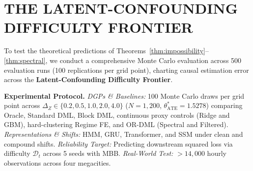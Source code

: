 \documentclass[twoside]{article}
\theoremstyle{definition}
\begin{document}
\vspace{-2mm}
\section{THE LATENT-CONFOUNDING DIFFICULTY FRONTIER}
\label{sec:experiments}

To test the theoretical predictions of Theorems~\ref{thm:impossibility}--\ref{thm:spectral}, we conduct a comprehensive Monte Carlo evaluation across 500 evaluation runs (100 replications per grid point), charting causal estimation error across the \textbf{Latent-Confounding Difficulty Frontier}.

\textbf{Experimental Protocol.} \emph{DGPs \& Baselines:} 100 Monte Carlo draws per grid point across $\Delta_Z \in \{0.2, 0.5, 1.0, 2.0, 4.0\}$ ($N=1,200$, $\theta_{\mathrm{ATE}}^* = 1.5278$) comparing Oracle, Standard DML, Block DML, continuous proxy controls (Ridge and GBM), hard-clustering Regime FE, and OR-DML (Spectral and Filtered). \emph{Representations \& Shifts:} HMM, GRU, Transformer, and SSM under clean and compound shifts. \emph{Reliability Target:} Predicting downstream squared loss via difficulty $\mathcal{D}_t$ across 5 seeds with MBB. \emph{Real-World Test:} $>14,000$ hourly observations across four megacities.
\end{document}
